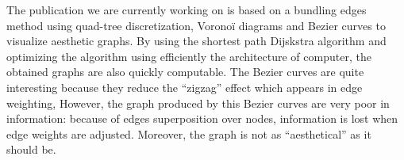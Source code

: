The publication we are currently working on is based on a bundling edges method using quad-tree discretization, Voronoï diagrams and Bezier curves to visualize aesthetic graphs. By using the shortest path Dijskstra  algorithm and optimizing the algorithm using efficiently the architecture of computer, the obtained graphs are also quickly computable. The Bezier curves are quite interesting because they reduce the “zigzag” effect which appears in edge weighting, However, the graph produced by this Bezier curves are very poor in information: because of edges superposition over nodes, information is lost when edge weights are adjusted. Moreover, the graph is not as “aesthetical” as it should be.
